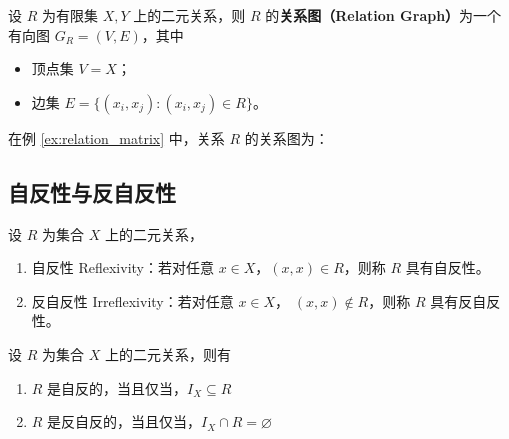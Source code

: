 \vspace{1em}

\begin{definition}[关系图]
    设 $ R $ 为有限集 $ X, Y $ 上的二元关系，则 $ R $ 的\textbf{关系图（Relation Graph）}为一个有向图 $ G_R = (V,E) $，其中
    \begin{itemize}
        \item 顶点集 $ V = X $；
        \item 边集 $ E = \{(x_i,x_j) : (x_i,x_j)\in R\} $。
    \end{itemize}
\end{definition}

\begin{example}
    在例 \ref{ex:relation_matrix} 中，关系 $ R $ 的关系图为：
    \begin{center}
    \end{center}
\end{example}

\vspace{1em}
\subsection{自反性与反自反性}

\begin{definition}
    设 $ R $ 为集合 $ X $ 上的二元关系，
    \begin{enumerate}
        \item 自反性 Reflexivity：若对任意 $ x\in X $，$ (x,x)\in R $，则称 $ R $ 具有自反性。
        \item 反自反性 Irreflexivity：若对任意 $ x\in X $， $ (x,x)\notin R $，则称 $ R $ 具有反自反性。
    \end{enumerate}
\end{definition}

\begin{proposition}
    设 $ R $ 为集合 $ X $ 上的二元关系，则有
    \begin{enumerate}
        \item $ R $ 是自反的，当且仅当，$ I_X \subseteq R $
        \item $ R $ 是反自反的，当且仅当，$ I_X \cap R = \varnothing $
    \end{enumerate}
\end{proposition}

